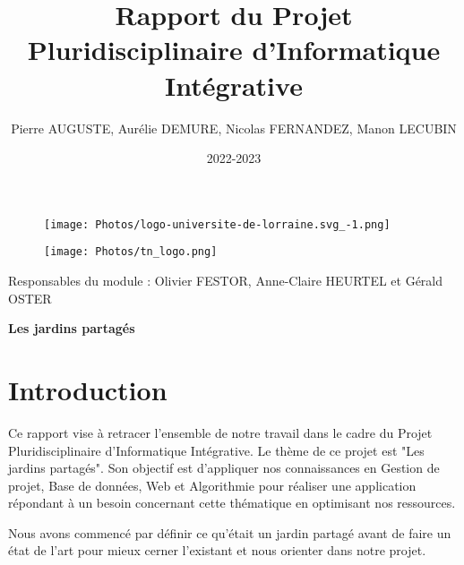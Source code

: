\documentclass{article}
\title{Rapport du Projet Pluridisciplinaire d'Informatique Intégrative}
\author{Pierre AUGUSTE, Aurélie DEMURE, Nicolas FERNANDEZ, Manon LECUBIN}
\date{2022-2023}
\begin{document}
\begin{figure}
    \centering
    \texttt{[image: Photos/logo-universite-de-lorraine.svg\_-1.png]}
    \label{fig:my_label}
\end{figure}

\begin{figure}
    \centering
    \texttt{[image: Photos/tn\_logo.png]}
    \label{fig:my_label}
\end{figure}


\maketitle Responsables du module : Olivier FESTOR, Anne-Claire HEURTEL et Gérald OSTER

\vspace{2cm}
\begin{center}
\begin{LARGE}
\textbf{Les jardins partagés}
\end{LARGE}
\end{center}

\newpage
\tableofcontents

\newpage
\section{Introduction}
Ce rapport vise à retracer l'ensemble de notre travail dans le cadre du Projet Pluridisciplinaire d'Informatique Intégrative. Le thème de ce projet est "Les jardins partagés". Son objectif est d'appliquer nos connaissances en Gestion de projet, Base de données, Web et Algorithmie pour réaliser une application répondant à un besoin concernant cette thématique en optimisant nos ressources.

Nous avons commencé par définir ce qu'était un jardin partagé avant de faire un état de l'art pour mieux cerner l'existant et nous orienter dans notre projet.
\end{document}
